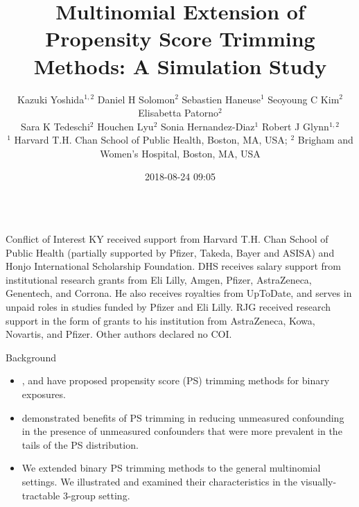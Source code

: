 \documentclass[final]{beamer}
\date{}
\author{
Kazuki Yoshida$^{1,2}$
Daniel H Solomon$^{2}$
Sebastien Haneuse$^{1}$
Seoyoung C Kim$^{2}$
Elisabetta Patorno$^{2}$ \\
Sara K Tedeschi$^{2}$
Houchen Lyu$^{2}$
Sonia Hernandez-Diaz$^{1}$
Robert J Glynn$^{1,2}$
\\
\normalsize{$^{1}$ Harvard T.H. Chan School of Public Health, Boston, MA, USA; }
\normalsize{$^{2}$ Brigham and Women's Hospital, Boston, MA, USA}
}
\date{2018-08-24 09:05}
\title{Multinomial Extension of Propensity Score Trimming Methods: A Simulation Study}
\begin{document}
\begin{frame}[label={sec:org6cddcf1}]{}
\vspace{-1cm}
\begin{columns}
\begin{column}[t]{0.48\columnwidth}
\begin{block}{Conflict of Interest}
\small
KY received support from Harvard T.H. Chan School of Public Health (partially supported by Pfizer, Takeda, Bayer and ASISA) and Honjo International Scholarship Foundation. DHS receives salary support from institutional research grants from Eli Lilly, Amgen, Pfizer, AstraZeneca, Genentech, and Corrona. He also receives royalties from UpToDate, and serves in unpaid roles in studies funded by Pfizer and Eli Lilly. RJG received research support in the form of grants to his institution from AstraZeneca, Kowa, Novartis, and Pfizer. Other authors declared no COI.
\end{block}


\begin{block}{Background}
\large
\begin{itemize}
\item \cite{crump_dealing_2009}, \cite{sturmer_treatment_2010} and \cite{walkerToolAssessingFeasibility2013} have proposed propensity score (PS) trimming methods for binary exposures.

\item \cite{sturmer_treatment_2010} demonstrated benefits of PS trimming in reducing unmeasured confounding in the presence of unmeasured confounders that were more prevalent in the tails of the PS distribution.

\item We extended binary PS trimming methods to the general multinomial settings. We illustrated and examined their characteristics in the visually-tractable 3-group setting.
\end{itemize}
\end{block}



\end{column}
\end{columns}
\end{frame}
\end{document}
